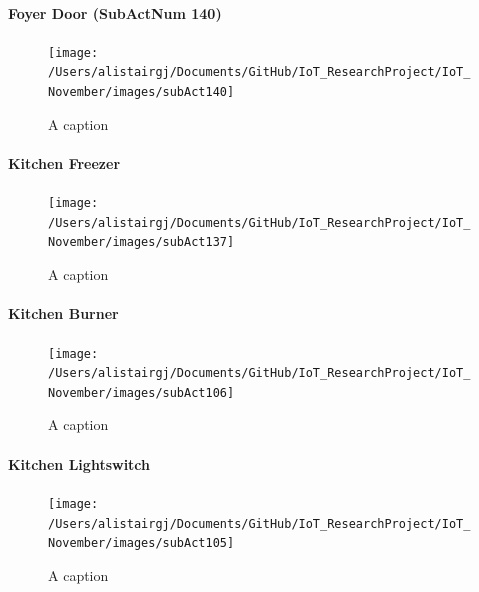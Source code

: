 \documentclass[11pt,]{article}
\let\oldparagraph\paragraph
\renewcommand{\paragraph}[1]{\oldparagraph{#1}\mbox{}}
\begin{document}
\hypertarget{foyer-door-subactnum-140}{%
\paragraph{Foyer Door (SubActNum 140)}\label{foyer-door-subactnum-140}}

\begin{figure}[H]

{\centering \texttt{[image: /Users/alistairgj/Documents/GitHub/IoT\_ResearchProject/IoT\_November/images/subAct140]} 

}

\caption{A caption}\label{fig:subAct140}
\end{figure}

\hypertarget{kitchen-freezer}{%
\paragraph{Kitchen Freezer}\label{kitchen-freezer}}

\begin{figure}[H]

{\centering \texttt{[image: /Users/alistairgj/Documents/GitHub/IoT\_ResearchProject/IoT\_November/images/subAct137]} 

}

\caption{A caption}\label{fig:subAct137}
\end{figure}

\hypertarget{kitchen-burner}{%
\paragraph{Kitchen Burner}\label{kitchen-burner}}

\begin{figure}[H]

{\centering \texttt{[image: /Users/alistairgj/Documents/GitHub/IoT\_ResearchProject/IoT\_November/images/subAct106]} 

}

\caption{A caption}\label{fig:subAct106}
\end{figure}

\hypertarget{kitchen-lightswitch}{%
\paragraph{Kitchen Lightswitch}\label{kitchen-lightswitch}}

\begin{figure}[H]

{\centering \texttt{[image: /Users/alistairgj/Documents/GitHub/IoT\_ResearchProject/IoT\_November/images/subAct105]} 

}

\caption{A caption}\label{fig:subAct105}
\end{figure}
\end{document}
